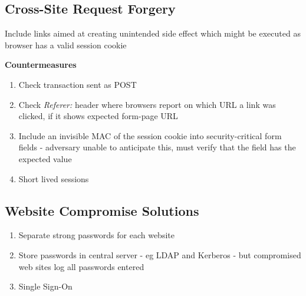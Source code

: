 \documentclass{article}
\newenvironment{pros}{\par\color[rgb]{0.066, 0.4, 0.129}}{\par}
\begin{document}
\subsection{Cross-Site Request Forgery}
Include links aimed at creating unintended side effect which might be executed as browser has a valid session cookie

\begin{pros}
\bigskip
\noindent
\textbf{Countermeasures}
\begin{enumerate}
	\item Check transaction sent as POST
	\item Check \textit{Referer:} header where browsers report on which URL a link was clicked, if it shows expected form-page URL
	\item Include an invisible MAC of the session cookie into security-critical form fields - adversary unable to anticipate this, must verify that the field has the expected value
	
	\item Short lived sessions
\end{enumerate}
\end{pros}

\subsection{Website Compromise Solutions}
\begin{enumerate}
	\item Separate strong passwords for each website
	
	\item Store passwords in central server - eg LDAP and Kerberos - but compromised web sites log all passwords entered
	\item Single Sign-On
\end{enumerate}
\end{document}
